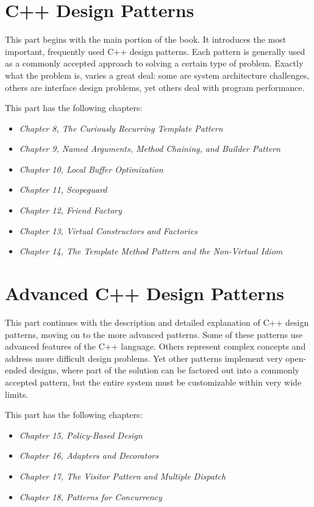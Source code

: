 \part{C++ Design Patterns}

This part begins with the main portion of the book. It introduces the most important, frequently used C++ design patterns. Each pattern is generally used as a commonly accepted approach to solving a certain type of problem. Exactly what the problem is, varies a great deal: some are system architecture challenges, others are interface design problems, yet others deal with program performance.

This part has the following chapters:

\begin{itemize}
\item
  \emph{Chapter 8, The Curiously Recurring Template Pattern}
\item
  \emph{Chapter 9, Named Arguments, Method Chaining, and Builder Pattern}
\item
  \emph{Chapter 10, Local Buffer Optimization}
\item
  \emph{Chapter 11, Scopeguard}
\item
  \emph{Chapter 12, Friend Factory}
\item
  \emph{Chapter 13, Virtual Constructors and Factories}
\item
  \emph{Chapter 14, The Template Method Pattern and the Non-Virtual Idiom}
\end{itemize}


\part{Advanced C++ Design Patterns}

This part continues with the description and detailed explanation of C++ design patterns, moving on to the more advanced patterns. Some of these patterns use advanced features of the C++ language. Others represent complex concepts and address more difficult design problems. Yet other patterns implement very open-ended designs, where part of the solution can be factored out into a commonly accepted pattern, but the entire system must be customizable within very wide limits.

This part has the following chapters:

\begin{itemize}
\item
  \emph{Chapter 15, Policy-Based Design}
\item
  \emph{Chapter 16, Adapters and Decorators}
\item
  \emph{Chapter 17, The Visitor Pattern and Multiple Dispatch}
\item
  \emph{Chapter 18, Patterns for Concurrency}
\end{itemize}